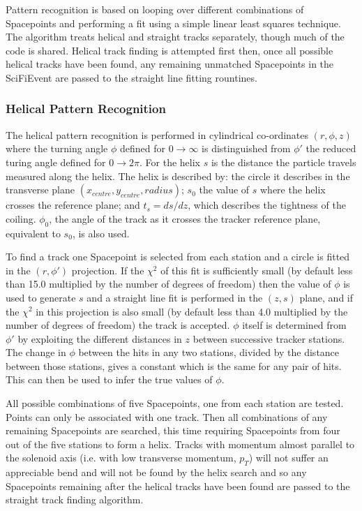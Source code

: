   Pattern recognition is based on looping over different combinations of Spacepoints and performing a fit using a simple linear least squares technique.  The algorithm treats helical and straight tracks separately, though much of the code is shared. Helical track finding is attempted first then, once all possible helical tracks have been found, any remaining unmatched Spacepoints in the SciFiEvent are passed to the straight line fitting rountines.

   \subsubsection{Helical Pattern Recognition}
   \label{subsubsec:HelicalPatternRecognition}

   The helical pattern recognition is performed in cylindrical co-ordinates $(r, \phi, z)$ where the turning angle $\phi$ defined for $0 \rightarrow \infty$ is distinguished from $\phi '$ the reduced turing angle defined  for $0 \rightarrow 2\pi$. For the helix $s$ is the distance the particle travels measured along the helix. The helix is described by: the circle it describes in the transverse plane $(x_{centre}, y_{centre}, radius)$; $s_0$ the value of $s$ where the helix crosses the reference plane; and $t_s = ds/dz$, which describes the tightness of the coiling. $\phi_0$, the angle of the track as it crosses the tracker reference plane, equivalent to $s_0$, is also used. 

   To find a track one Spacepoint is selected from each station and a circle is fitted in the $(r, \phi')$ projection. If the $\chi^2$ of this fit is sufficiently small (by default less than 15.0 multiplied by the number of degrees of freedom) then the value of $\phi$ is used to generate $s$ and a straight line fit is performed in the $(z,s)$ plane, and if the $\chi^2$ in this projection is also small (by default less than 4.0 multiplied by the number of degrees of freedom) the track is accepted.  $\phi$ itself is determined from $\phi'$ by exploiting the different distances in $z$ between successive tracker stations.  The change in $\phi$ between the hits in any two stations, divided by the distance between those stations, gives a constant which is the same for any pair of hits.  This can then be used to infer the true values of $\phi$.

   All possible combinations of five Spacepoints, one from each station are tested. Points can only be associated with one track. Then all combinations of any remaining Spacepoints are searched, this time requiring Spacepoints from four out of the five stations to form a helix. Tracks with momentum almost parallel to the solenoid axis (i.e. with low transverse momentum, $p_T$) will not suffer an appreciable bend and will not be found by the helix search and so any Spacepoints remaining after the helical tracks have been found are passed to the straight track finding algorithm.

